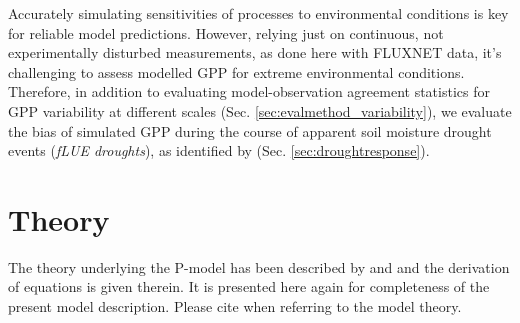 \documentclass{myreport}
\begin{document}
Accurately simulating sensitivities of processes to environmental conditions is key for reliable model predictions. However, relying just on continuous, not experimentally disturbed measurements, as done here with FLUXNET data, it's challenging to assess modelled GPP for extreme environmental conditions. Therefore, in addition to evaluating model-observation agreement statistics for GPP variability at different scales (Sec. \ref{sec:evalmethod_variability}), we evaluate the bias of simulated GPP during the course of apparent soil moisture drought events (\textit{fLUE droughts}), as identified by \cite{stocker18newphyt} (Sec. \ref{sec:droughtresponse}).

\section{Theory}
\label{sec:theory}

The theory underlying the P-model has been described by \cite{prentice14ecollett} and \cite{wang17natpl} and the derivation of equations is given therein. It is presented here again for completeness of the present model description. Please cite \cite{wang17natpl} when referring to the model theory. 
\end{document}
